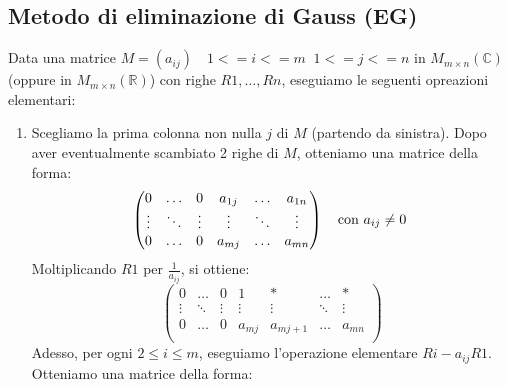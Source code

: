 \documentclass[a4paper]{article}
\theoremstyle{break}
\theoremstyle{break}
\theoremstyle{break}
\theoremstyle{break}
\begin{document}
\subsection{Metodo di eliminazione di Gauss (EG)}
Data una matrice \( M = (a_{ij}) \quad 1<=i<=m \;\; 1<=j<=n \) in \( M_{m \times n}(\mathbb{C}) \)
(oppure in \( M_{m \times n}(\mathbb{R}) \)) con righe \( R1, \ldots, Rn \), eseguiamo le
seguenti opreazioni elementari:
\begin{enumerate}
	\item Scegliamo la prima colonna non nulla \( j \) di \( M \) (partendo da sinistra).
	      Dopo aver eventualmente scambiato 2 righe di \( M \), otteniamo una matrice
	      della forma:
	      \[
		      \begin{pmatrix}
			      0      & \ldots & 0      & a_{1j} & \ldots & a_{1n} \\
			      \vdots & \ddots & \vdots & \vdots & \ddots & \vdots \\
			      0      & \ldots & 0      & a_{mj} & \ldots & a_{mn} \\
		      \end{pmatrix} \quad \text{con \( a_{ij} \neq 0 \) }
	      \]
	      Moltiplicando \( R1 \) per \( \frac{1}{a_{ij}} \), si ottiene:
	      \[
		      \begin{pmatrix}
			      0      & \ldots & 0      & 1      & *        & \ldots & *      \\
			      \vdots & \ddots & \vdots & \vdots & \vdots   & \ddots & \vdots \\
			      0      & \ldots & 0      & a_{mj} & a_{mj+1} & \ldots & a_{mn} \\
		      \end{pmatrix}
	      \]
	      Adesso, per ogni \( 2 \le i \le m \), eseguiamo l'operazione elementare \( Ri - a_{ij}R1 \).
	      Otteniamo una matrice della forma:
	      \begin{figure}[H]
		      \centering
\end{figure}
\end{enumerate}
\end{document}
